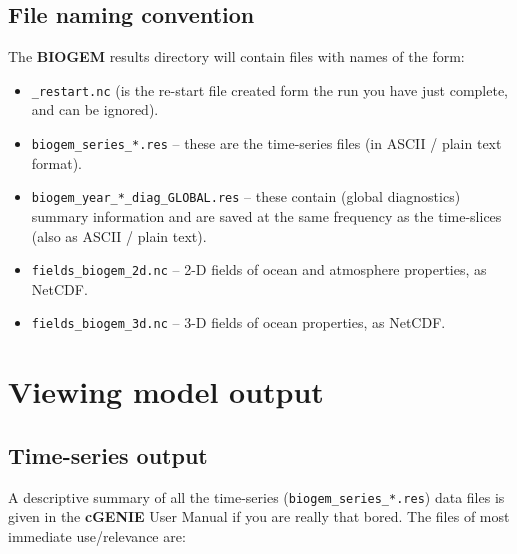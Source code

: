 \documentclass[11pt,fleqn]{book} %
\begin{document}

\subsection{File naming convention}

The \textbf{BIOGEM} results directory will contain files with names of the form:

\begin{itemize}[noitemsep]
\setlength{\itemindent}{.2in}
\item  \texttt{\_restart.nc} (is the re-start file created form the run you have just complete, and can be ignored).
\item \texttt{biogem\_series\_*.res} – these are the time-series files (in ASCII / plain text format).
\item \texttt{biogem\_year\_*\_diag\_GLOBAL.res} – these contain (global diagnostics) summary information and are saved at the same frequency as the time-slices (also as ASCII / plain text).
\item \texttt{fields\_biogem\_2d.nc} – 2-D fields of ocean and atmosphere properties, as NetCDF.
\item \texttt{fields\_biogem\_3d.nc} – 3-D fields of ocean properties, as NetCDF.
\end{itemize}


\newpage


\section{Viewing model output}


\subsection{Time-series output}

A descriptive summary of all the time-series (\texttt{biogem\_series\_*.res}) data files is given in the \textbf{cGENIE} User Manual if you are really that bored. The files of most immediate use/relevance are:
\end{document}
